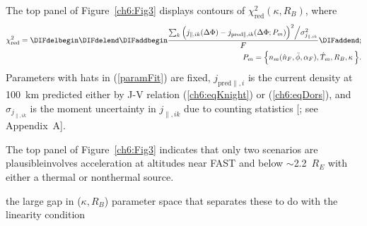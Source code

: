   The top panel of Figure~\ref{ch6:Fig3} displays contours of
  $\chi^2_{\textrm{red}} ( \kappa, R_B )$, where
  \begin{subequations}
    \begin{align} \chi^2_{\mathrm{red}} = \DIFdelbegin %
\DIFdelend \DIFaddbegin \dfrac{\sum_k \Big ( j_{\parallel,i k} (\Delta \Phi) - j_{\textrm{pred}\parallel,i k}(\Delta \Phi; P_m) \Big )^2 \Big / \sigma_{j_{\parallel,i k}}^2}{F}\DIFaddend ; \label{ch6:eqChi2red} \\
      P_m = \Big \{ n_m ( \hat{n}_F, \bar{\phi} , \alpha_F ), \hat{T}_m, R_B,
      \kappa \, \Big \}. \label{paramFit}
    \end{align}
  \end{subequations}
  \DIFaddbegin {}\DIFaddend Parameters with hats in
  (\ref{paramFit}) are fixed, $j_{\textrm{pred}\parallel,i} $ is the current
  density at 100~km predicted either by J-V relation (\ref{ch6:eqKnight}) or
  (\ref{ch6:eqDors}), and $\sigma_{j_{\parallel,i k}}$ is the moment uncertainty
  in $j_{\parallel,i k}$ due to counting statistics [\citealp{Gershman2015}; see
  Appendix~A].

  The top panel of Figure~\ref{ch6:Fig3} indicates that only two scenarios are
  plausible\DIFdelbegin {}\DIFdelend \DIFaddbegin {}\DIFaddend involves
  acceleration at altitudes near FAST and below $\sim$2.2~$R_E$
  \DIFaddbegin {}\DIFaddend with either a thermal or nonthermal source\DIFaddbegin {}\DIFaddend .

  \DIFdelbegin {}\DIFdelend \DIFaddbegin {}\DIFaddend the large gap in ($\kappa, R_B$) parameter space that separates
  these \DIFdelbegin {}\DIFdelend \DIFaddbegin {}\DIFaddend to do
  with the linearity condition \DIFdelbegin {}\DIFdelend \DIFaddbegin {}

